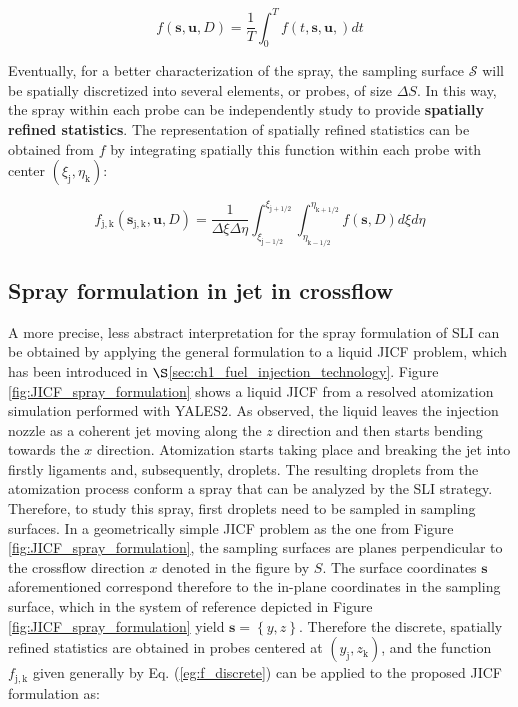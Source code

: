 \begin{equation}
\label{eq:f_general_time_integrated}
f \left( \boldsymbol{s}, \boldsymbol{u}, D \right) = \frac{1}{T} \int_0^T f \left( t, \boldsymbol{s}, \boldsymbol{u}, \right) dt
\end{equation}

Eventually, for a better characterization of the spray, the sampling surface $\mathcal{S}$ will be spatially discretized into several elements, or probes, of size $\Delta S$. In this way, the spray within each probe can be independently study to provide \textbf{spatially refined statistics}. The representation of spatially refined statistics can be obtained from $f$ by integrating spatially this function within each probe with center $\left( \xi_\mathrm{j}, \eta_\mathrm{k} \right)$:

\begin{equation}
\label{eg:f_discrete}
f_\mathrm{j,k} \left( \boldsymbol{s}_\mathrm{j,k}, \boldsymbol{u}, D \right) = \frac{1}{\Delta \xi \Delta \eta} \int_{\xi_\mathrm{j-1/2}}^{\xi_\mathrm{j+1/2}} \int_{\eta_\mathrm{k-1/2}}^{\eta_\mathrm{k+1/2}}  f \left( \boldsymbol{s}, D \right) d\xi d\eta
\end{equation}

\subsection{Spray formulation in jet in crossflow}

A more precise, less abstract interpretation for the spray formulation of SLI can be obtained by applying the general formulation to a liquid JICF problem, which has been introduced in $\S$\ref{sec:ch1_fuel_injection_technology}. Figure \ref{fig:JICF_spray_formulation} shows a liquid JICF from a resolved atomization simulation performed with YALES2. As observed, the liquid leaves the injection nozzle as a coherent jet moving along the $z$ direction and then starts bending towards the $x$ direction. Atomization starts taking place and breaking the jet into firstly ligaments and, subsequently, droplets. The resulting droplets from the atomization process conform a spray that can be analyzed by the SLI strategy. Therefore, to study this spray, first droplets need to be sampled in sampling surfaces. In a geometrically simple JICF problem as the one from Figure \ref{fig:JICF_spray_formulation}, the sampling surfaces are planes perpendicular to the crossflow direction $x$ denoted in the figure by $S$. The surface coordinates $\boldsymbol{s}$ aforementioned correspond therefore to the in-plane coordinates in the sampling surface, which in the system of reference depicted in Figure \ref{fig:JICF_spray_formulation} yield $\boldsymbol{s} = \left\lbrace y, z \right\rbrace$. Therefore the discrete, spatially refined statistics are obtained in probes centered at $\left( y_\mathrm{j}, z_\mathrm{k} \right)$, and the function $f_\mathrm{j,k}$ given generally by Eq. (\ref{eg:f_discrete}) can be applied to the proposed JICF formulation as:

